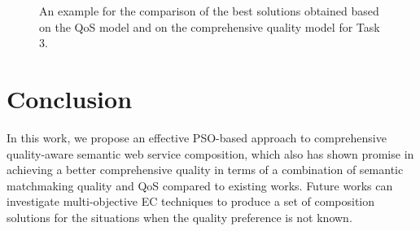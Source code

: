 \documentclass{llncs}
\begin{document}
\begin{figure}[h]
 \caption{An example for the comparison of the best solutions obtained based on the QoS model and on the comprehensive quality model for Task 3.}
 \label{comparisontest}
\end{figure}
\vspace{-1.0cm}

\section{Conclusion}\label{conclusion}

In this work, we propose an effective PSO-based approach to comprehensive quality-aware semantic web service composition, which also has shown promise in achieving a better comprehensive quality in terms of a combination of semantic matchmaking quality and QoS compared to existing works. Future works can investigate multi-objective EC techniques to produce a set of composition solutions for the situations when the quality preference is not known.

\vspace{-0.3cm}


\end{document}
